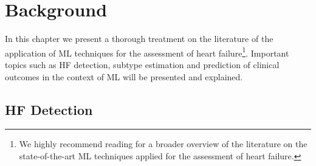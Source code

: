 \documentclass[../thesis.tex]{subfiles}
\begin{document}
\chapter{Background}
\label{chap:back}

In this chapter we present a thorough treatment on the literature of the application of ML techniques for the assessment of heart failure\footnote{We highly recommend reading \cite{tripoliti2017heart} for a broader overview of the literature on the state-of-the-art ML techniques applied for the assessment of heart failure.}. Important topics such as HF detection, subtype estimation and prediction of clinical outcomes in the context of ML will be presented and explained.

\section{HF Detection}
\label{sec:hfdet}
\end{document}
